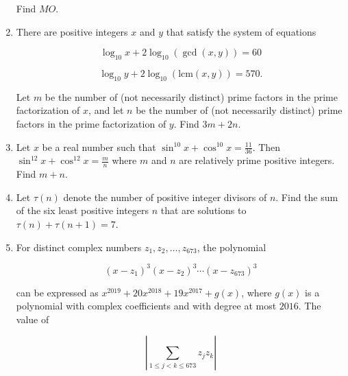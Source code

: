 \documentclass{article}
\begin{document}
\begin{enumerate}[label=\arabic*., itemsep=0.5em]
Find \(MO\).\par \vspace{0.5em}\item There are positive integers \(x\) and \(y\) that satisfy the system of equations

\begin{equation*}
\log_{10} x + 2 \log_{10} (\gcd(x,y)) = 60
\end{equation*}
 
\begin{equation*}
\log_{10} y + 2 \log_{10} (\text{lcm}(x,y)) = 570.
\end{equation*}

Let \(m\) be the number of (not necessarily distinct) prime factors in the prime factorization of \(x\), and let \(n\) be the number of (not necessarily distinct) prime factors in the prime factorization of \(y\). Find \(3m+2n\).\par \vspace{0.5em}\item Let \(x\) be a real number such that \(\sin^{10}x+\cos^{10} x = \tfrac{11}{36}\). Then \(\sin^{12}x+\cos^{12} x = \tfrac{m}{n}\) where \(m\) and \(n\) are relatively prime positive integers. Find \(m+n\).\par \vspace{0.5em}\item Let \(\tau(n)\) denote the number of positive integer divisors of \(n\). Find the sum of the six least positive integers \(n\) that are solutions to \(\tau (n) + \tau (n+1) = 7\).\par \vspace{0.5em}\item For distinct complex numbers \(z_1,z_2,\dots,z_{673}\), the polynomial 

\begin{equation*}
(x-z_1)^3(x-z_2)^3 \cdots (x-z_{673})^3
\end{equation*}

can be expressed as \(x^{2019} + 20x^{2018} + 19x^{2017}+g(x)\), where \(g(x)\) is a polynomial with complex coefficients and with degree at most \(2016\). The value of 

\begin{equation*}
\left| \sum_{1 \le j <k \le 673} z_jz_k \right|
\end{equation*}


\end{enumerate}
\end{document}
